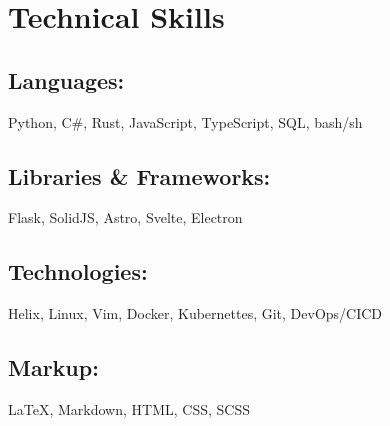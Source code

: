 \section{Technical Skills}

\subsection{Languages:} Python, C\#, Rust, JavaScript, TypeScript, SQL, bash/sh
\subsection{Libraries \& Frameworks:} Flask, SolidJS, Astro, Svelte, Electron
\subsection{Technologies:} Helix, Linux, Vim, Docker, Kubernettes, Git, DevOps/CICD
\subsection{Markup:} {\LaTeX}, Markdown, HTML, CSS, SCSS
